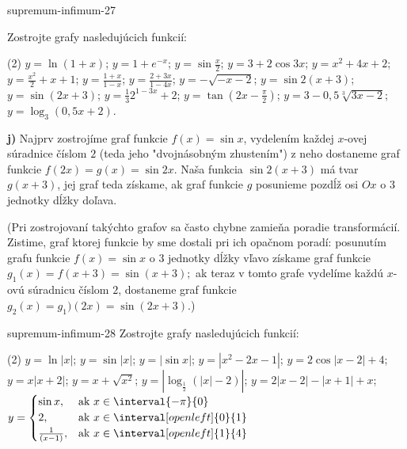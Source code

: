\begin{defproblem}{supremum-infimum-27}
\begin{samepage}
Zostrojte grafy nasledujúcich funkcií:
\begin{tasks}(2)
  \task $y=\ln (1+x)$;
  \task $y=1+e^{-x}$;
  \task $y=\sin \frac{x}{2}$;
  \task $y=3+2\cos 3x$;
  \task $y=x^2+4x+2$;
  \task $y=\frac{x^2}{2}+x+1$;
  \task $y=\frac{1+x}{1-x}$;
  \task $y=\frac{2+3x}{1-4x}$;
  \task $y=-\sqrt{-x-2}$;
  \task $y=\sin 2(x+3)$;
  \task $y=\sin (2x+3)$;
  \task $y=\frac{1}{3}2^{1-3x}+2$;
  \task $y=\tan (2x-\frac{\pi}{2})$;
  \task $y=3-0,5\sqrt[3]{3x-2}$;
  \task $y=\log_3 (0,5x+2)$.
\end{tasks}
\end{samepage}

\begin{solution}
  \textbf{j)}
  Najprv zostrojíme graf funkcie $f(x)=\sin x$, vydelením každej $x$-ovej
  súradnice číslom $2$ (teda jeho "dvojnásobným zhustením") z neho dostaneme
  graf funkcie $f(2x)=g(x)=\sin 2x$. Naša funkcia $\sin 2(x+3)$ má tvar
  $g(x+3)$, jej graf teda získame, ak graf funkcie $g$ posunieme pozdĺž osi $Ox$
  o $3$ jednotky dĺžky doľava.

  (Pri zostrojovaní takýchto grafov sa často chybne zamieňa poradie
  transformácií. Zistime, graf ktorej funkcie by sme dostali pri ich opačnom
  poradí: posunutím grafu funkcie $f(x) = \sin{x}$ o $3$ jednotky dĺžky vľavo
  získame graf funkcie $g_1(x) = f(x + 3) = \sin{(x+3)};$ ak teraz v tomto grafe
  vydelíme každú $x$-ovú súradnicu číslom $2$, dostaneme graf funkcie $g_2(x) =
  g_1)(2x) = \sin{(2x+3)}$.)
\end{solution}
\end{defproblem}

\begin{defproblem}{supremum-infimum-28}
Zostrojte grafy nasledujúcich funkcií:
\begin{tasks}(2)
  \task $y=\ln |x|$;
  \task $y=\sin |x|$;
  \task $y=|\sin x|$;
  \task $y=|x^2-2x-1|$;
  \task $y=2\cos |x-2|+4$;
  \task $y=x|x+2|$;
  \task $y=x+\sqrt{x^2}$;
  \task $y=|\log_{\frac{1}{2}}(|x|-2)|$;
  \task $y=2|x-2|-|x+1|+x$;
  \task $y=
    \begin{cases}
      \sin x,          & \text{ak } x \in \interval{-\pi}{0} \\
      2,               & \text{ak } x \in \interval[open left]{0}{1} \\
      \frac{1}{(x-1)}, & \text{ak } x \in \interval[open left]{1}{4}
    \end{cases}
  $
\end{tasks}
\end{defproblem}

